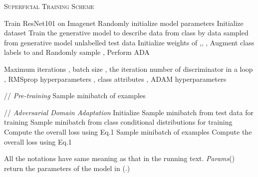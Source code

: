 \documentclass[10pt,twocolumn,letterpaper]{article}
\begin{document}
\begin{algorithm}[H]
	\caption{\textsc{Superficial Training Scheme} \label{alg:system}}
	\begin{algorithmic}[1]
		\State Train ResNet101 on Imagenet
		\State Randomly initialize model parameters
		\State Initialize dataset 
			\State Train the generative model to describe data from class  by  
			\State  data sampled from generative model
			\State  unlabelled test data
			\State Initialize weights of ,, ,  
			\State Augment class labels to  and 
		\State Randomly sample ,  
		\State Perform ADA
		\EndFor
	
	\end{algorithmic}
\end{algorithm}
\begin{algorithm}[H]
	\begin{algorithmic}[1]
		Maximum iterations , batch size , the iteration number of discriminator in a loop , RMSprop hyperparameters , class attributes , ADAM hyperparameters 
		
		\State // \textit{Pre-training}
		\For{}
		\State 
         \EndFor
            \State Sample minibatch of examples 

         \State
         
          
          \State  
         \EndFor
    \State // \textit{Adversarial Domain Adaptation}     
	\State Initialize 
	\State 
	\State 
{}
            \State Sample minibatch  from test data for training 
            \State Sample minibatch  from class conditional distributions for training 
        	\State Compute the overall loss  using Eq.1
        \State 
{}
		 \State Sample minibatch of examples 
        \State Compute the overall loss  using Eq.1
        \State 
        \EndFor

	
		\EndFor
\end{algorithmic}
	\caption{All the notations have same meaning as that in the running text. \textit{Params}() return the parameters of the model in (.)}
	\label{alg_label}
	
\end{algorithm}
 
\end{document}
